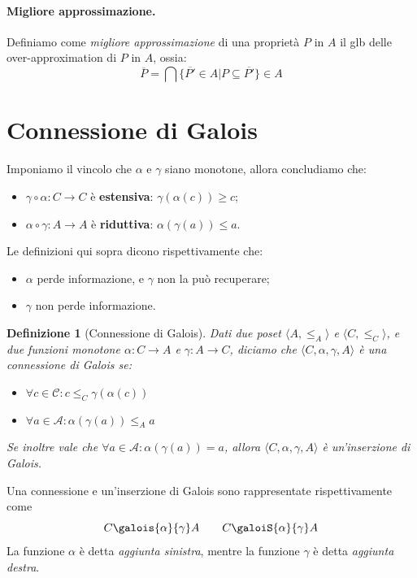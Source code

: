 \documentclass[a4paper, 10pt]{book}
\newcommand{\galoistuple}{\langle C, \alpha, \gamma , A \rangle}
\newtheorem{definit}{Definizione}[subsection]
\begin{document}
	\paragraph{Migliore approssimazione.}
	Definiamo come \textit{migliore approssimazione} di una proprietà $P$ in $A$ il glb delle over-approximation di $P$ in $A$, ossia: \[  \overline{P} = \bigcap \lbrace \overline{P'} \in A | P \subseteq \overline{P'} \rbrace \in A \]
	
	\section{Connessione di Galois}
	Imponiamo il vincolo che $\alpha$ e $\gamma$ siano monotone, allora concludiamo che: \begin{itemize}
		\item $\gamma \circ \alpha: C \to C$ è \textbf{estensiva}: $\gamma(\alpha(c)) \geq c$;
		\item $\alpha \circ \gamma : A \to A$ è \textbf{riduttiva}: $\alpha(\gamma(a)) \leq a$.
	\end{itemize}

	Le definizioni qui sopra dicono rispettivamente che:
	\begin{itemize}
		\item $\alpha$ perde informazione, e $\gamma$ non la può recuperare;
		\item $\gamma$ non perde informazione.
	\end{itemize}

	\begin{definit}[Connessione di Galois]
		Dati due poset $\langle A , \leq_A \rangle$ e $\langle C , \leq_C \rangle$, e due funzioni monotone $\alpha: C \to A$ e $\gamma: A \to C$, diciamo che $\galoistuple$ è una connessione di Galois se:
		\begin{itemize}
			\item $\forall c \in \mathcal{C}: c \leq_C \gamma(\alpha(c))$
			\item $\forall a \in \mathcal{A}: \alpha(\gamma(a)) \leq_A a$
		\end{itemize}
		
		Se inoltre vale che $\forall a \in \mathcal{A}: \alpha(\gamma(a)) = a$, allora $\galoistuple$ è un'inserzione di Galois.
	\end{definit}
	Una connessione e un'inserzione di Galois sono rappresentate rispettivamente come \[  C \galois{\alpha}{\gamma} A \qquad C \galoiS{\alpha}{\gamma} A \]
	La funzione $\alpha$ è detta \textit{aggiunta sinistra}, mentre la funzione $\gamma$ è detta \textit{aggiunta destra}.
	
\end{document}
